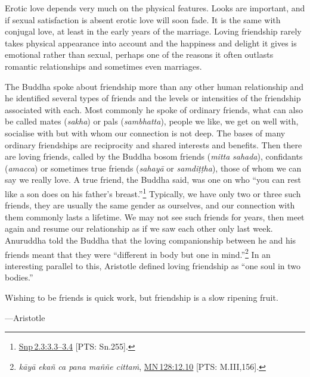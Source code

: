 \documentclass[10pt, openright]{book}
\newenvironment{epigram-2}%
{%
\setstretch{1.4}
\vspace{1em}
\noindent
\quoting[leftmargin=2cm,rightmargin=2cm]%
\begin{itshape}
\large
}%
{\end{itshape}\endquoting
}%
\newenvironment{epigram-2-cite}%
{%
\quoting[leftmargin=2cm,rightmargin=2cm]%
\noindent\normal\hspace*{\fill} 
}%
{\endquoting
}%
\begin{document}
Erotic love depends very much on the physical features. Looks are important, and if sexual satisfaction is absent erotic love will soon fade. It is the same with conjugal love, at least in the early years of the marriage. Loving friendship rarely takes physical appearance into account and the happiness and delight it gives is emotional rather than sexual, perhaps one of the reasons it often outlasts romantic relationships and sometimes even marriages.


The Buddha spoke about friendship more than any other human relationship and he identified several types of friends and the levels or intensities of the friendship associated with each. Most commonly he spoke of ordinary friends, what can also be called mates (\textit{sakha}) or pals (\textit{sambhatta}), people we like, we get on well with, socialise with but with whom our connection is not deep. The bases of many ordinary friendships are reciprocity and shared interests and benefits. Then there are loving friends, called by the Buddha bosom friends (\textit{mitta} \textit{sahada}), confidants (\textit{amacca}) or sometimes true friends (\textit{sahayā} or \textit{samdiṭṭha}), those of whom we can say we really love. A true friend, the Buddha said, was one on who “you can rest like a son does on his father’s breast.”\footnote {\href{https://suttacentral.net/snp2.3/en/sujato\#3.3}{Snp 2.3:3.3–3.4} [PTS: Sn.255].} Typically, we have only two or three such friends, they are usually the same gender as ourselves, and our connection with them commonly lasts a lifetime. We may not see such friends for years, then meet again and resume our relationship as if we saw each other only last week. Anuruddha told the Buddha that the loving companionship between he and his friends meant that they were “different in body but one in mind.”\footnote {\textit{kāyā ekañ ca pana maññe cittaṁ}, \href{https://suttacentral.net/mn128/en/sujato\#12.10}{MN 128:12.10} [PTS: M.III,156].} In an interesting parallel to this, Aristotle defined loving friendship as “one soul in two bodies.”


\begin{epigram-2}
Wishing to be friends is quick work, but friendship is a slow ripening fruit.
\end{epigram-2}
\begin{epigram-2-cite}
—Aristotle
\end{epigram-2-cite}
\end{document}
